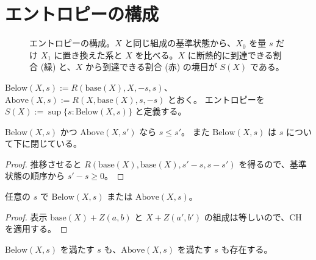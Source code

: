 \section{エントロピーの構成}

\begin{figure}[htbp]
  \centering
  \caption{エントロピーの構成。$X$ と同じ組成の基準状態から、$X_0$ を量 $s$ だけ $X_1$ に置き換えた系と $X$ を比べる。$X$ に断熱的に到達できる割合 (緑) と、$X$ から到達できる割合 (赤) の境目が $S(X)$ である。}
  \label{fig:entropy}
\end{figure}

\begin{definition}[エントロピー]
  \label{def:entropy}
  \leanok
  $\mathrm{Below}(X, s) := R(\mathrm{base}(X), X, -s, s)$、$\mathrm{Above}(X, s) := R(X, \mathrm{base}(X), s, -s)$ とおく。
  エントロピーを $S(X) := \sup\{ s : \mathrm{Below}(X, s) \}$ と定義する。
\end{definition}

\begin{lemma}[下と上の比較]
  \label{lem:below-le-above}
  \leanok
  $\mathrm{Below}(X, s)$ かつ $\mathrm{Above}(X, s')$ なら $s \le s'$。
  また $\mathrm{Below}(X, s)$ は $s$ について下に閉じている。
\end{lemma}

\begin{proof}
  \leanok
  推移させると $R(\mathrm{base}(X), \mathrm{base}(X), s'-s, s-s')$ を得るので、基準状態の順序から $s' - s \ge 0$。
\end{proof}

\begin{lemma}[どちらか一方は成り立つ]
  \label{lem:below-or-above}
  \leanok
  任意の $s$ で $\mathrm{Below}(X, s)$ または $\mathrm{Above}(X, s)$。
\end{lemma}

\begin{proof}
  \leanok
  表示 $\mathrm{base}(X) + Z(a, b)$ と $X + Z(a', b')$ の組成は等しいので、CH を適用する。
\end{proof}

\begin{lemma}[エントロピーは有限]
  \label{lem:finite}
  \leanok
  $\mathrm{Below}(X, s)$ を満たす $s$ も、$\mathrm{Above}(X, s)$ を満たす $s$ も存在する。
\end{lemma}

